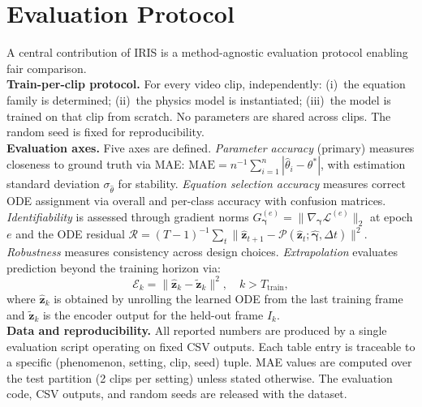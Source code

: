 \documentclass[runningheads]{llncs}
\begin{document}
\section{Evaluation Protocol}
\label{sec:eval_protocol}

A central contribution of IRIS is a method-agnostic evaluation protocol enabling fair comparison.\\
\noindent
\textbf{Train-per-clip protocol.} For every video clip, independently: (i)~the equation family is determined; (ii)~the physics model is instantiated; (iii)~the model is trained on that clip from scratch. No parameters are shared across clips. The random seed is fixed for reproducibility.
\\
\noindent
\textbf{Evaluation axes.} Five axes are defined. \emph{Parameter accuracy} (primary) measures closeness to ground truth via MAE:
$\mathrm{MAE} = n^{-1} \sum_{i=1}^{n} |\hat{\theta}_i - \theta^*|$,
with estimation standard deviation $\sigma_{\hat{\theta}}$ for stability. \emph{Equation selection accuracy} measures correct ODE assignment via overall and per-class accuracy with confusion matrices. \emph{Identifiability} is assessed through gradient norms $G_{\boldsymbol{\gamma}}^{(e)} = \|\nabla_{\boldsymbol{\gamma}}\mathcal{L}^{(e)}\|_2$ at epoch $e$ and the ODE residual $\mathcal{R} = (T{-}1)^{-1}\sum_t \|\hat{\mathbf{z}}_{t+1} - \mathcal{P}(\hat{\mathbf{z}}_t; \hat{\boldsymbol{\gamma}}, \Delta t)\|^2$. \emph{Robustness} measures consistency across design choices. \emph{Extrapolation} evaluates prediction beyond the training horizon via:
\begin{equation}
    \mathcal{E}_k = \|\hat{\mathbf{z}}_k - \tilde{\mathbf{z}}_k\|^2, \quad k > T_{\mathrm{train}},
    \label{eq:extrapolation}
\end{equation}
where $\hat{\mathbf{z}}_k$ is obtained by unrolling the learned ODE from the last training frame and $\tilde{\mathbf{z}}_k$ is the encoder output for the held-out frame $I_k$.
\\
\noindent
\textbf{Data and reproducibility.} All reported numbers are produced by a single evaluation script operating on fixed CSV outputs. Each table entry is traceable to a specific (phenomenon, setting, clip, seed) tuple. MAE values are computed over the test partition (2 clips per setting) unless stated otherwise. The evaluation code, CSV outputs, and random seeds are released with the dataset.
\end{document}
